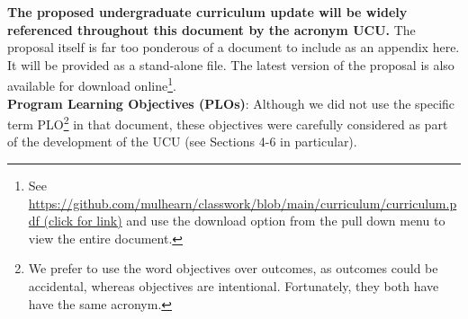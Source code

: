 \documentclass[12pt]{article}
\begin{document}
{\bf The proposed undergraduate curriculum update will be widely
  referenced throughout this document by the acronym UCU.}  The
proposal itself is far too ponderous of a document to include as an
appendix here.  It will be provided as a stand-alone file.  The latest
version of the proposal is also available for download
online\footnote{ See
  \href{https://github.com/mulhearn/classwork/blob/main/curriculum/curriculum.pdf}
  {https://github.com/mulhearn/classwork/blob/main/curriculum/curriculum.pdf
    (click for link)} and use the download option from the pull down menu to view
  the entire document.  }.\\[3pt]
\noindent
{\bf Program Learning Objectives (PLOs)}: Although we did not use the
specific term PLO\footnote{We prefer to use the word objectives over
  outcomes, as outcomes could be accidental, whereas objectives are
  intentional.  Fortunately, they both have have the same acronym.} in
that document, these objectives were carefully considered as part of
the development of the UCU (see Sections 4-6 in particular).
\end{document}
